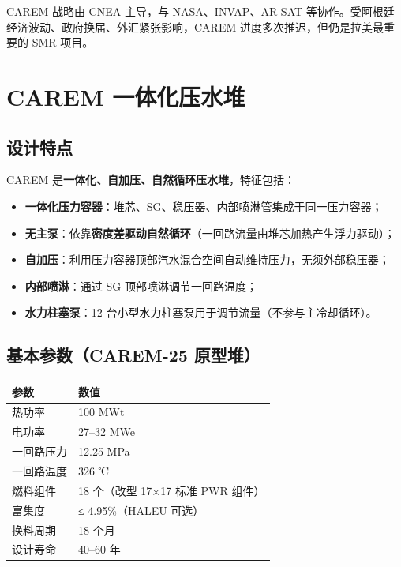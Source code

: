 \documentclass[
  UTF8,
  scheme=plain,
  fontsize=10pt,
  openany
]{ctexbook}
\begin{document}
CAREM 战略由 CNEA 主导，与 NASA、INVAP、AR-SAT
等协作。受阿根廷经济波动、政府换届、外汇紧张影响，CAREM
进度多次推迟，但仍是拉美最重要的 SMR 项目。

\section{CAREM
一体化压水堆}\label{carem-ux4e00ux4f53ux5316ux538bux6c34ux5806}

\subsection{设计特点}\label{ux8bbeux8ba1ux7279ux70b9}

CAREM 是\textbf{一体化、自加压、自然循环压水堆}，特征包括：

\begin{itemize}
\tightlist
\item
  \textbf{一体化压力容器}：堆芯、SG、稳压器、内部喷淋管集成于同一压力容器；
\item
  \textbf{无主泵}：依靠\textbf{密度差驱动自然循环}（一回路流量由堆芯加热产生浮力驱动）；
\item
  \textbf{自加压}：利用压力容器顶部汽水混合空间自动维持压力，无须外部稳压器；
\item
  \textbf{内部喷淋}：通过 SG 顶部喷淋调节一回路温度；
\item
  \textbf{水力柱塞泵}：12
  台小型水力柱塞泵用于调节流量（不参与主冷却循环）。
\end{itemize}

\subsection{基本参数（CAREM-25
原型堆）}\label{ux57faux672cux53c2ux6570carem-25-ux539fux578bux5806}

{\def\LTcaptype{none} %
\begin{longtable}[]{@{}ll@{}}
\toprule\noalign{}
参数 & 数值 \\
\midrule\noalign{}
\endhead
\bottomrule\noalign{}
\endlastfoot
热功率 & 100 MWt \\
电功率 & 27--32 MWe \\
一回路压力 & 12.25 MPa \\
一回路温度 & 326 ℃ \\
燃料组件 & 18 个（改型 17×17 标准 PWR 组件） \\
富集度 & ≤ 4.95\%（HALEU 可选） \\
换料周期 & 18 个月 \\
设计寿命 & 40--60 年 \\
\end{longtable}
}
\end{document}
